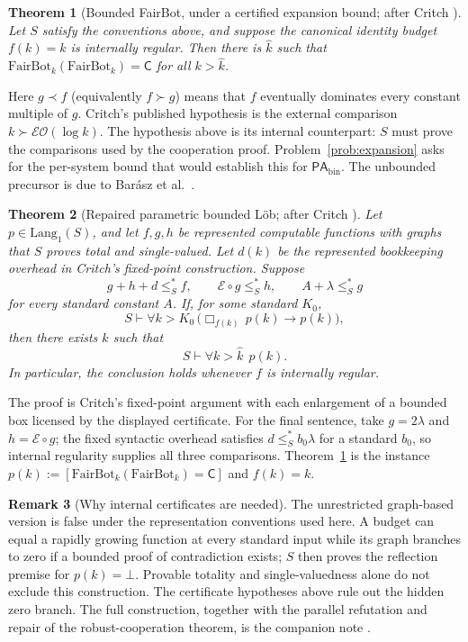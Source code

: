 \documentclass[11pt]{amsart}
\theoremstyle{plain}
\newtheorem{theorem}{Theorem}[section]
\theoremstyle{definition}
\newtheorem{remark}[theorem]{Remark}
\newcommand{\PAbin}{\mathsf{PA}_{\mathrm{bin}}}
\newcommand{\Lang}{\mathrm{Lang}}
\newcommand{\FB}{\mathrm{FairBot}}
\newcommand{\leSstar}{\mathrel{\leq_S^{*}}}
\begin{document}
\begin{theorem}[Bounded FairBot, under a certified expansion bound; after Critch \cite{critch2016}]
\label{thm:fairbot}
Let $S$ satisfy the conventions above, and suppose the canonical identity budget $f(k)=k$ is internally regular. Then there is $\hat{k}$ such that $\FB_k(\FB_k) = \mathsf{C}$ for all $k > \hat{k}$.
\end{theorem}

Here $g \prec f$ (equivalently $f \succ g$) means that $f$ eventually dominates every constant multiple of $g$. Critch's published hypothesis is the external comparison $k\succ\mathcal{E}\mathcal{O}(\log k)$. The hypothesis above is its internal counterpart: $S$ must prove the comparisons used by the cooperation proof. Problem~\ref{prob:expansion} asks for the per-system bound that would establish this for $\PAbin$. The unbounded precursor is due to Bar\'asz et al.\ \cite{barasz2014}.

\begin{theorem}[Repaired parametric bounded L\"ob; after Critch \cite{critch2016}]
\label{thm:pbl}
Let $p \in \Lang_1(S)$, and let $f,g,h$ be represented computable functions with graphs that $S$ proves total and single-valued. Let $d(k)$ be the represented bookkeeping overhead in Critch's fixed-point construction. Suppose
\[
g+h+d\leSstar f,\qquad \mathcal{E}\circ g\leSstar h,
\qquad A+\lambda\leSstar g
\]
for every standard constant $A$. If, for some standard $K_0$,
\[
S \vdash \forall k>K_0\,\bigl(\Box_{f(k)}\, p(k) \to p(k)\bigr),
\]
then there exists $\hat{k}$ such that
\[
S \vdash \forall k > \hat{k}\;\, p(k).
\]
In particular, the conclusion holds whenever $f$ is internally regular.
\end{theorem}

The proof is Critch's fixed-point argument with each enlargement of a bounded box licensed by the displayed certificate. For the final sentence, take $g=2\lambda$ and $h=\mathcal{E}\circ g$; the fixed syntactic overhead satisfies $d\leSstar b_0\lambda$ for a standard $b_0$, so internal regularity supplies all three comparisons. Theorem~\ref{thm:fairbot} is the instance $p(k):=[\FB_k(\FB_k)=\mathsf C]$ and $f(k)=k$.

\begin{remark}[Why internal certificates are needed]
\label{rem:pbl-audit}
The unrestricted graph-based version is false under the representation conventions used here. A budget can equal a rapidly growing function at every standard input while its graph branches to zero if a bounded proof of contradiction exists; $S$ then proves the reflection premise for $p(k)=\bot$. Provable totality and single-valuedness alone do not exclude this construction. The certificate hypotheses above rule out the hidden zero branch. The full construction, together with the parallel refutation and repair of the robust-cooperation theorem, is the companion note \cite{sol2026}.
\end{remark}
\end{document}
